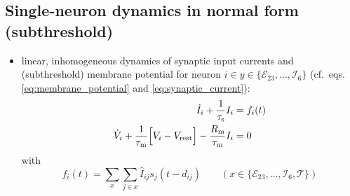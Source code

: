 \documentclass[10pt,a4paper,twoside,american]{article}
\theoremstyle{definitionstyle}
\newcommand{\RM}{R_\text{m}}
\newcommand{\tauM}{\tau_\text{m}}
\newcommand{\tauS}{\tau_\text{s}}
\begin{document}
\begin{appendices}
  \renewcommand{\thesection}{A\arabic{section}}  
\section{Single-neuron dynamics in normal form (subthreshold)}
\label{sec:normal_form}
\begin{itemize}
\item linear, inhomogeneous dynamics of synaptic input currents and (subthreshold) membrane potential for neuron $i \in y\in\{\mathcal{E}_{23},\ldots,\mathcal{I}_{6}\}$ (cf.~eqs.\,\eqref{eq:membrane_potential} and \eqref{eq:synaptic_current}):
  \begin{equation}
    \label{eq:1st_order_ode}
    \begin{aligned}
      \dot{I}_{i} + \frac{1}{\tauS} I_{i} &= f_{i}(t)\\
      \dot{V}_{i} + \frac{1}{\tauM} \Bigl[ V_{i}-V_\text{rest}\Bigr] - \frac{\RM}{\tauM} I_{i} &= 0
    \end{aligned}
  \end{equation}
  with
  \begin{equation}
	  f_{i}(t)=\sum_{x}\sum_{j\in x} \hat{I}_{ij} s_{j}(t-d_{ij})
    \qquad(x\in\{\mathcal{E}_{23},\ldots,\mathcal{I}_{6}, \mathcal{T}\})
  \end{equation}


\end{itemize}
\end{appendices}
\end{document}
